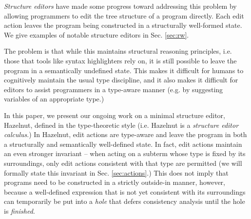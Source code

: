 

\emph{Structure editors} have made some progress toward addressing this
problem by allowing programmers to edit the tree structure of a program
directly. Each edit action leaves the program being constructed in a
structurally well-formed state. We give examples of notable structure editors in Sec. \ref{sec:rw}.  

The problem is that while this maintains structural
reasoning principles, i.e. those that tools like syntax highlighters rely
on, it is still possible to leave the program in a semantically undefined state. This makes it difficult for humans to cognitively maintain the usual type discipline, and it also makes it difficult for editors to assist programmers in a type-aware manner (e.g. by suggesting variables of an appropriate type.)%


In this paper, we present our ongoing work on a minimal structure editor, Hazelnut,  defined in the type-theoretic style (i.e. Hazelnut is a \emph{structure editor calculus}.) In Hazelnut, edit actions are type-aware and leave the program in both a structurally and semantically well-defined state. In fact, edit actions maintain an even stronger invariant -- when acting on a subterm whose type is fixed by its surroundings, only edit actions consistent with that type are permitted (we will formally state this invariant in Sec. \ref{sec:actions}.) This does not imply that programs need to be constructed in a strictly outside-in manner, however, because a well-defined expression that is not yet consistent with its surroundings can temporarily be put into a \emph{hole} that defers consistency analysis until the hole is \emph{finished}.

